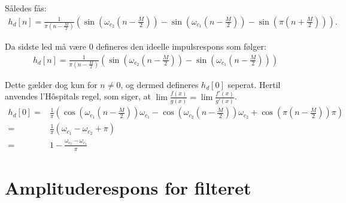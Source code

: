 Således fås:
\begin{align*}
h_d[n]= \frac{1}{\pi \left(n-\frac{M}{2}\right)} \left(\sin\left(\omega_{c_2} \left(n-\frac{M}{2}\right)\right) - \sin\left(\omega_{c_1} \left(n-\frac{M}{2}\right)\right) - \sin\left( \pi\left( n + \frac{M}{2} \right) \right) \right).
\end{align*}

Da sidste led må være $0$ defineres den ideelle impulsrespons som følger:
\begin{align*}
h_d[n]= \frac{1}{\pi \left(n-\frac{M}{2}\right)} \left(\sin\left(\omega_{c_2} \left(n-\frac{M}{2}\right)\right) - \sin\left(\omega_{c_1} \left(n-\frac{M}{2}\right)\right)\right)
\end{align*}

Dette gælder dog kun for $n \neq 0$, og dermed defineres $h_d[0]$ seperat. Hertil anvendes l'Hôspitals regel, som siger, at $\lim \frac{f(x)}{g(x)}=\lim \frac{f'(x)}{g'(x)}$.
\begin{align*}
h_d[0]=& \frac{1}{\pi} \left( \cos\left( \omega_{c_1} \left(n-\frac{M}{2}\right) \right)\omega_{c_1} - \cos\left( \omega_{c_2} \left(n-\frac{M}{2}\right) \right)\omega_{c_2} +  \cos\left(\pi \left( n- \frac{M}{2}\right) \right) \pi \right) \\
=& \frac{1}{\pi}\left( \omega_{c_1} - \omega_{c_2} + \pi \right) \\
=& 1 - \frac{\omega_{c_2}-\omega_{c_1}}{\pi}
\end{align*}

\section{Amplituderespons for filteret} \label{app2}

